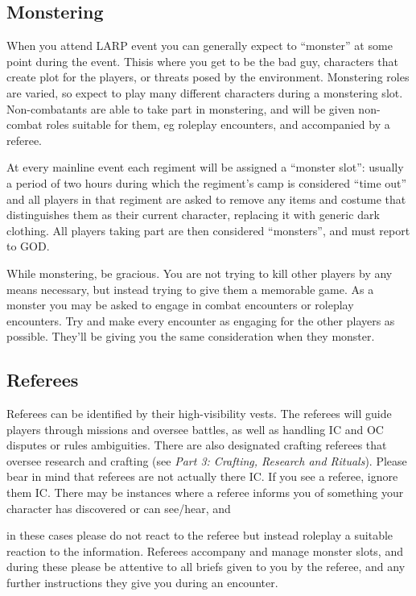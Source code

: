 \subsection{Monstering}

When you attend LARP event you can generally expect to ``monster'' at some point during the event. Thisis where you get to be the bad guy, characters that create plot for the players, or threats posed by the environment. Monstering roles are varied, so expect to play many different characters during a monstering slot. Non-combatants are able to take part in monstering, and will be given non-combat roles suitable for them, eg roleplay encounters, and accompanied by a referee.

At every mainline event each regiment will be assigned a ``monster slot'': usually a period of two hours during which the regiment's camp is considered ``time out'' and all players in that regiment are asked to remove any items and costume that distinguishes them as their current character, replacing it with generic dark clothing. All players taking part are then considered ``monsters'', and must report to GOD.

While monstering, be gracious. You are not trying to kill other players by any means necessary, but instead trying to give them a memorable game. As a monster you may be asked to engage in combat encounters or roleplay encounters. Try and make every encounter as engaging for the other players as possible. They'll be giving you the same consideration when they monster.

\subsection{Referees}

Referees can be identified by their high-visibility vests. The referees will guide players through missions and oversee battles, as well as handling IC and OC disputes or rules ambiguities. There are also designated crafting referees that oversee research and crafting (see \textit{Part 3: Crafting, Research and Rituals}). Please bear in mind that referees are not actually there IC. If you see a referee, ignore them IC. There may be instances where a referee informs you of something your character has discovered or can see/hear, and

in these cases please do not react to the referee but instead roleplay a suitable reaction to the information. Referees accompany and manage monster slots, and during these please be attentive to all briefs given to you by the referee, and any further instructions they give you during an encounter.

